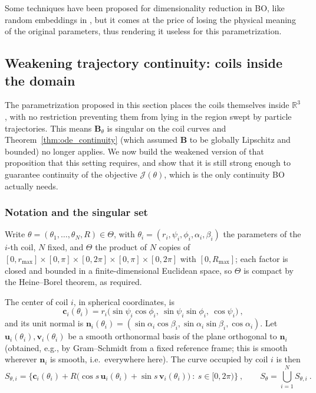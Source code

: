 \documentclass{article}
\begin{document}
	Some techniques have been proposed for dimensionality reduction in BO, like random embeddings in \cite{rembo}, but it comes at the price of losing the physical meaning of the original parameters, thus rendering it useless for this parametrization.
	
	\subsection{Weakening trajectory continuity: coils inside the domain}
	\label{sec:coils_inside}
	
	The parametrization proposed in this section places the coils themselves inside $\mathbb{R}^3$, with no restriction preventing them from lying in the region swept by particle trajectories. This means $\mathbf{B}_\theta$ is singular on the coil curves and Theorem~\ref{thm:ode_continuity} (which assumed $\mathbf{B}$ to be globally Lipschitz and bounded) no longer applies. We now build the weakened version of that proposition that this setting requires, and show that it is still strong enough to guarantee continuity of the objective $\mathcal{J}(\theta)$, which is the only continuity BO actually needs.
	
	\subsubsection{Notation and the singular set}
	
	Write $\theta = (\theta_1, \dots, \theta_N, R) \in \Theta$, with $\theta_i = (r_i, \psi_i, \phi_i, \alpha_i, \beta_i)$ the parameters of the $i$-th coil, $N$ fixed, and $\Theta$ the product of $N$ copies of $[0, r_{\max}] \times [0,\pi] \times [0,2\pi] \times [0,\pi] \times [0,2\pi]$ with $[0, R_{\max}]$; each factor is closed and bounded in a finite-dimensional Euclidean space, so $\Theta$ is compact by the Heine--Borel theorem, as required.
	
	The center of coil $i$, in spherical coordinates, is
	\begin{equation}
		\mathbf{c}_i(\theta_i) = r_i\big(\sin\psi_i\cos\phi_i,\ \sin\psi_i\sin\phi_i,\ \cos\psi_i\big) \ ,
	\end{equation}
	and its unit normal is $\mathbf{n}_i(\theta_i) = (\sin\alpha_i\cos\beta_i, \sin\alpha_i\sin\beta_i, \cos\alpha_i)$. Let $\mathbf{u}_i(\theta_i), \mathbf{v}_i(\theta_i)$ be a smooth orthonormal basis of the plane orthogonal to $\mathbf{n}_i$ (obtained, e.g., by Gram--Schmidt from a fixed reference frame; this is smooth wherever $\mathbf{n}_i$ is smooth, i.e.\ everywhere here). The curve occupied by coil $i$ is then
	\begin{equation}
		S_{\theta,i} = \big\{ \mathbf{c}_i(\theta_i) + R\big(\cos s \, \mathbf{u}_i(\theta_i) + \sin s \, \mathbf{v}_i(\theta_i)\big) \ : \ s \in [0, 2\pi) \big\} \ , \qquad S_\theta = \bigcup_{i=1}^N S_{\theta,i} \ .
	\end{equation}
	
\end{document}
